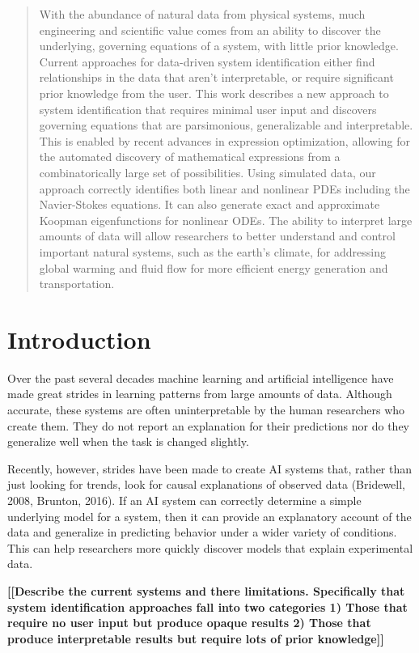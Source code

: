 \documentclass{article}
\newcommand{\todo}[1]{\textbf{[[#1]]}}
\begin{document}
\begin{abstract}
With the abundance of natural data from physical systems, much engineering and scientific value comes from an ability to discover the underlying, governing equations of a system, with little prior knowledge. Current approaches for data-driven system identification either find relationships in the data that aren't interpretable, or require significant prior knowledge from the user. This work describes a new approach to system identification that requires minimal user input and discovers governing equations that are parsimonious, generalizable and interpretable. This is enabled by recent advances in expression optimization, allowing for the automated discovery of mathematical expressions from a combinatorically large set of possibilities. Using simulated data, our approach correctly identifies both linear and nonlinear PDEs including the Navier-Stokes equations. It can also generate exact and approximate Koopman eigenfunctions for nonlinear ODEs. The ability to interpret large amounts of data will allow researchers to better understand and control important natural systems, such as the earth’s climate, for addressing global warming and fluid flow for more efficient energy generation and transportation.
\end{abstract}

\section{Introduction}
\label{introduction}

Over the past several decades machine learning and artificial intelligence have made great strides in learning patterns from large amounts of data. Although accurate, these systems are often uninterpretable by the human researchers who create them. They do not report an explanation for their predictions nor do they generalize well when the task is changed slightly.

Recently, however, strides have been made to create AI systems that, rather than just looking for trends, look for causal explanations of observed data (Bridewell, 2008, Brunton, 2016). If an AI system can correctly determine a simple underlying model for a system, then it can provide an explanatory account of the data and generalize in predicting behavior under a wider variety of conditions. This can help researchers more quickly discover models that explain experimental data.

\todo{Describe the current systems and there limitations. Specifically that system identification approaches fall into two categories 1) Those that require no user input but produce opaque results 2) Those that produce interpretable results but require lots of prior knowledge}
\end{document}
